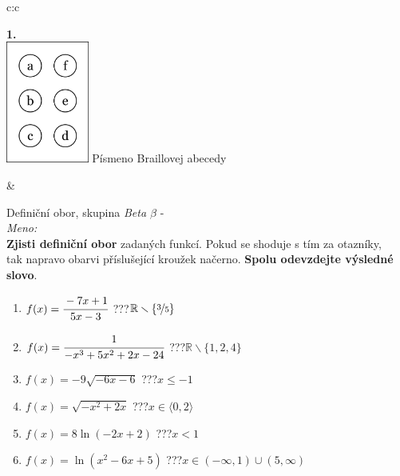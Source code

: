 \documentclass[10pt]{report}
\begin{document}
\begin{tabular}{c:c}
\begin{minipage}[c][99mm][t]{0.49\linewidth}
\begin{center}
\begin{minipage}{0.20\linewidth}
\begin{center}
{\Huge\bfseries 1.} \\[2mm]
\includegraphics[height=40mm]{../images/braille.png}
{\small Písmeno Braillovej abecedy}
\end{center}
\end{minipage}
\end{center}
\end{minipage}
&
\begin{minipage}[c][99mm][t]{0.49\linewidth}
\begin{center}
\vspace{7mm}
{\huge Definiční obor, skupina \textit{Beta $\beta$} -}\\[4.5mm]
\textit{Meno:}\phantom{xxxxxxxxxxxxxxxxxxxxxxxxxxxxxxxxxxxxxxxxxxxxxxxxxxxxxxxxxxxxxxxxx}\\[3.5mm]
\textbf{Zjisti definiční obor} zadaných funkcí. Pokud se shoduje s tím za otazníky,\\tak napravo obarvi příslušející kroužek načerno. \textbf{Spolu odevzdejte výsledné slovo}.\\[3mm]
\begin{minipage}{0.77\linewidth}
\begin{center}
\begin{varwidth}{\textwidth}
\begin{enumerate}
\normalsize
\item $f(x)=\cfrac{-7x+1}{5x-3}$\quad \dotfill\; ???\;\dotfill \quad $\mathbb{R}\smallsetminus\{\nicefrac{3}{5}\}$
\item $f(x)=\cfrac{1}{-x^3+5x^2+2x-24}$\quad \dotfill\; ???\;\dotfill \quad $\mathbb{R}\smallsetminus\{1,2,4\}$
\item $f(x)=-9\sqrt{-6x-6}$\quad \dotfill\; ???\;\dotfill \quad $x\leq-1$
\item $f(x)=\sqrt{-x^2+2x}$\quad \dotfill\; ???\;\dotfill \quad $x\in\langle0 , 2\rangle$
\item $f(x)=8\ln{(-2x+2)}$\quad \dotfill\; ???\;\dotfill \quad $x<1$
\item $f(x)=\ln{(x^2-6x+5)}$\quad \dotfill\; ???\;\dotfill \quad $x\in(-\infty , 1)\cup(5 , \infty)$

\end{enumerate}
\end{varwidth}
\end{center}
\end{minipage}
\end{center}
\end{minipage}
\end{tabular}
\end{document}
